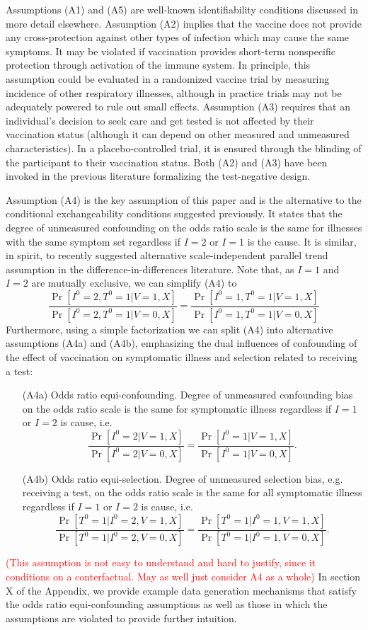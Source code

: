 \documentclass[11pt]{article}
\newcommand{\ken}{\textcolor{red}}
\begin{document}
Assumptions (A1) and (A5) are well-known identifiability conditions discussed in more detail elsewhere. Assumption (A2) implies that the vaccine does not provide any cross-protection against other types of infection which may cause the same symptoms.   It may be violated if vaccination provides short-term nonspecific protection through activation of the immune system. In principle, this assumption could be evaluated in a randomized vaccine trial by measuring incidence of other respiratory illnesses, although in practice trials may not be adequately powered to rule out small effects. Assumption (A3) requires that an individual's decision to seek care and get tested is not affected by their vaccination status (although it can depend on other measured and unmeasured characteristics). In a placebo-controlled trial, it is ensured through the blinding of the participant to their vaccination status. Both (A2) and (A3) have been invoked in the previous literature formalizing the test-negative design. 

Assumption (A4) is the key assumption of this paper and is the alternative to the conditional exchangeability conditions suggested previously. It states that the degree of unmeasured confounding on the odds ratio scale is the same for illnesses with the same symptom set regardless if $I=2$ or $I=1$ is the cause. It is similar, in spirit, to recently suggested alternative scale-independent parallel trend assumption in the difference-in-differences literature. Note that, as $I = 1$ and $I = 2$ are mutually exclusive, we can simplify (A4) to
\begin{equation}
    \frac{\Pr[I^0 = 2, T^0 = 1 | V = 1, X]}{\Pr[I^0 = 2, T^0 = 1 | V = 0, X]} =\frac{\Pr[I^0 = 1, T^0 = 1 | V = 1, X]}{\Pr[I^0 = 1, T^0 = 1 | V = 0, X]}
\end{equation}
Furthermore, using a simple factorization we can split (A4) into alternative assumptions (A4a) and (A4b), emphasizing the dual influences of confounding of the effect of vaccination on symptomatic illness and selection related to receiving a test:
\begin{itemize}
    \item[(A4a)] Odds ratio equi-confounding. Degree of unmeasured confounding bias on the odds ratio scale is the same for symptomatic illness regardless if $I=1$ or $I=2$ is cause, i.e. 
    $$\frac{\Pr[I^0 = 2 | V = 1, X]}{\Pr[I^0 = 2 | V = 0, X]} =\frac{\Pr[I^0 = 1 | V = 1, X]}{\Pr[I^0 = 1 | V = 0, X]}.$$
    \item[(A4b)] Odds ratio equi-selection. Degree of unmeasured selection bias, e.g. receiving a test, on the odds ratio scale is the same for all symptomatic illness regardless if $I=1$ or $I=2$ is cause, i.e. 
    $$\frac{\Pr[T^0 = 1 | I^0 = 2, V = 1, X]}{\Pr[T^0 = 1 | I^0 = 2, V = 0, X]} =\frac{\Pr[T^0 = 1 | I^0 = 1, V = 1, X]}{\Pr[T^0 = 1 | I^0 = 1, V = 0, X]}.$$
\end{itemize}
\ken{(This assumption is not easy to understand and hard to justify, since it conditions on a conterfactual. May as well just consider A4 as a whole)}
In section X of the Appendix, we provide example data generation mechanisms that satisfy the odds ratio equi-confounding assumptions as well as those in which the assumptions are violated to provide further intuition.
\end{document}
